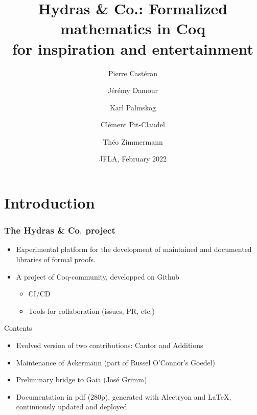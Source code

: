 \documentclass[10pt]{beamer}
\title{Hydras \& Co.: Formalized mathematics in Coq\\
  for inspiration and entertainment
}
\date{JFLA, February 2022}
\author{
  Pierre Castéran \inst{1}
  \and
  Jérémy Damour \inst{2}
  \and
  Karl Palmskog \inst{3}
  \and Clément Pit-Claudel \inst{4}
  \and Théo Zimmermann \inst{5}
}
\institute{
  Univ. Bordeaux, CNRS, Bordeaux INP, LaBRI, UMR 5800, F-33400 Talence, France  %
  \and
  Univ. de Paris, F-75013 Paris, France
  \and
  KTH Royal Institute of Technology, Stockholm, Sweden
  \and
  MIT CSAIL, Cambridge, Massachusetts, USA
  \and
  Inria, Univ. de Paris, CNRS, IRIF, UMR 8243, F-75013 Paris, France
}
\newcommand{\community}{Coq-community\xspace}
\newcommand{\alectr}{Alectryon\xspace}
\newcommand{\Hydras}{Hydras \& Co$\text.$\xspace}
\begin{document}

\begin{frame}
  \maketitle
\end{frame}


\section{Introduction}
\begin{frame}
  \frametitle{The \Hydras project}
  \begin{block}{}
    \begin{itemize}
    \item Experimental platform for the  development of \textcolor{lookcolor}{maintained} and \textcolor{lookcolor}{documented} libraries of formal proofs.
    \item A project of \community, developped on Github
      \begin{itemize}
      \item CI/CD
        \item Tools for collaboration (issues, PR, etc.)
      \end{itemize}
    \end{itemize}
  \end{block}
  \begin{block}{Contents}
    \begin{itemize}
    \item Evolved version  of two contributions: \textcolor{plugincolor}{Cantor} and \textcolor{plugincolor}{Additions}
    \item Maintenance of \textcolor{plugincolor}{Ackermann}
      (part of Russel O'Connor's \textcolor{plugincolor}{Goedel})
    \item Preliminary bridge to \textcolor{plugincolor}{Gaia} (José Grimm)
      \item Documentation in pdf (280p), generated  with \textcolor{lookcolor}{\alectr} and \LaTeX, continuously updated and deployed
    \end{itemize}
  \end{block}
 
\end{frame}

\end{document}
